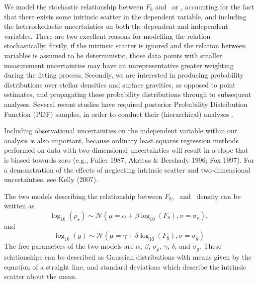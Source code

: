 We model the stochastic relationship between $F_8$ and \logg\ or \rhostar,
accounting for the fact that there exists some intrinsic scatter in
the dependent variable, and including the heteroskedastic uncertainties on both
the dependent and independent variables.
There are two excellent reasons for modelling the relation stochastically;
firstly, if the intrinsic scatter is ignored and the relation between
variables is assumed to be deterministic, those data points with smaller
measurement uncertainties may have an unrepresentative greater weighting
during the fitting process.
Secondly, we are interested in producing probability distributions over stellar
densities and surface gravities, as opposed to point estimates, and propagating
these probability distributions through to subsequent analyses.
Several recent studies have required posterior Probability Distribution
Function (PDF) samples, in order to conduct their (hierarchical)
analyses \citep[e.g.][]{rogers:2015, foreman-mackey:2014, angus:2015}.

Including observational uncertainties on the independent variable within our
analysis is also important, because ordinary least squares regression methods
performed on data with two-dimensional uncertainties will result in a slope
that is biased towards zero
(e.g., Fuller 1987; Akritas \& Bershady 1996; Fox 1997).
For a demonstration of the effects of neglecting intrinsic scatter and
two-dimensional uncertainties, see Kelly (2007).

The two models describing the relationship between $F_8$, \logg\ and \rhostar\
density can be written as
\begin{equation}
	\log_{10}(\rho_\star) \sim \mathcal{N}(\mu = \alpha + \beta
	\log_{10}(F_8), \sigma = \sigma_{\rho}),
\end{equation}
\label{eq:rho}
and
\begin{equation}
	\log_{10}(g) \sim \mathcal{N}(\mu = \gamma + \delta \log_{10}(F_8),
	\sigma = \sigma_g)
\end{equation}
\label{eq:logg}
The free parameters of the two models are $\alpha$, $\beta$, $\sigma_{\rho}$,
$\gamma$, $\delta$, and $\sigma_g$.
These relationships can be described as Gaussian distributions with means
given by the equation of a straight line, and standard deviations which
describe the intrinsic scatter about the mean.

